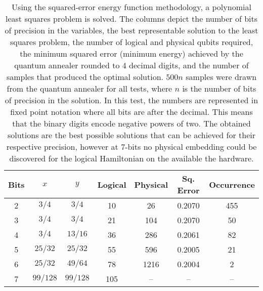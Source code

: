 \begin{table}
    \centering
    \begin{tabular}{c|c c|c c|c|c}
         Bits & $x$ & $y$ & Logical & Physical & Sq. Error & Occurrence \\ \hline
         2 & $3/4$ & $3/4$ & 10 & 26 & 0.2070 & 455 \\
         3 & $3/4$ & $3/4$ & 21 & 104 & 0.2070 & 50 \\
         4 & $3/4$ & $13/16$ & 36 & 286 & 0.2061 & 82 \\
         5 & $25/32$ & $25/32$ & 55 & 596 & 0.2005 & 21 \\
         6 & $25/32$ & $49/64$ & 78 & 1216 & 0.2004 & 2 \\
         7 & $99/128$ & $99/128$ & 105 & -- & -- & -- \\
    \end{tabular}
    \caption{Using the squared-error energy function methodology, a polynomial least squares problem is solved. The columns depict the number of bits of precision in the variables, the best representable solution to the least squares problem, the number of logical and physical qubits required, the minimum squared error (minimum energy) achieved by the quantum annealer rounded to 4 decimal digits, and the number of samples that produced the optimal solution. $500n$ samples were drawn from the quantum annealer for all tests, where $n$ is the number of bits of precision in the solution. In this test, the numbers are represented in fixed point notation where all bits are after the decimal. This means that the binary digits encode negative powers of two. The obtained solutions are the best possible solutions that can be achieved for their respective precision, however at 7-bits no physical embedding could be discovered for the logical Hamiltonian on the available the hardware.}
    \label{tab:poly_ls}
\end{table}
